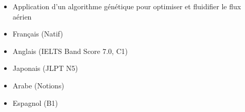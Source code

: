 \documentclass[10pt,a4paper,ragged2e,withhyper]{altacv}
\begin{document}
\begin{paracol}{2}
\begin{itemize}
\item Application d'un algorithme génétique pour optimiser et fluidifier le flux aérien
\end{itemize}


\divider
\medskip



\newpage









\switchcolumn



\begin{itemize}
    \item Français (Natif)
    \item Anglais (IELTS Band Score 7.0, C1)
    \item Japonais (JLPT N5)
    \item Arabe (Notions)
    \item Espagnol (B1) 
\end{itemize}


\end{paracol}
\end{document}
